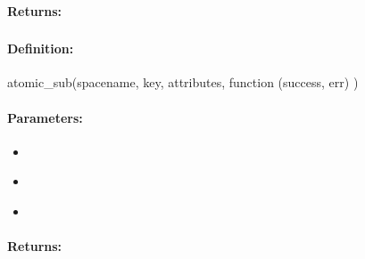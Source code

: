 \paragraph{Returns:}


\pagebreak
\subsubsection{}
\label{api:nodejs:atomic_sub}


\paragraph{Definition:}
\begin{javascriptcode}
atomic_sub(spacename, key, attributes, function (success, err) {})
\end{javascriptcode}
\paragraph{Parameters:}
\begin{itemize}[noitemsep]
\item {}\\

\item {}\\

\item {}\\

\end{itemize}

\paragraph{Returns:}


\pagebreak
\subsubsection{}
\label{api:nodejs:cond_atomic_sub}


